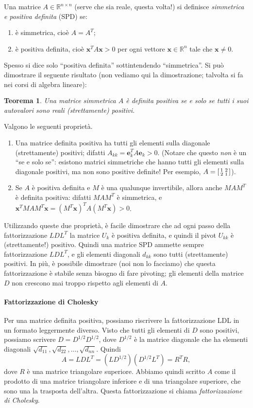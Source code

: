 \documentclass[a4paper]{report}
\newtheorem{theorem}{Teorema}[chapter]
\theoremstyle{definiton}
\theoremstyle{remark}
\begin{document}
Una matrice $A\in\mathbb{R}^{n\times n}$ (serve che sia reale, questa volta!) si definisce \emph{simmetrica e positiva definita} (SPD) se:
\begin{enumerate}
    \item è simmetrica, cioè $A=A^T$;
    \item è positiva definita, cioè $\mathbf{x}^TA\mathbf{x} > 0$ per ogni vettore $\mathbf{x}\in \mathbb{R}^n$ tale che $\mathbf{x}\neq 0$.
\end{enumerate}
Spesso si dice solo ``positiva definita'' sottintendendo ``simmetrica''. Si può dimostrare il seguente risultato (non vediamo qui la dimostrazione; talvolta si fa nei corsi di algebra lineare):
\begin{theorem}
Una matrice simmetrica $A$ è definita positiva se e solo se tutti i suoi autovalori sono reali (strettamente) positivi. 
\end{theorem}
Valgono le seguenti proprietà.
\begin{enumerate}
    \item Una matrice definita positiva ha tutti gli elementi sulla diagonale (strettamente) positivi; difatti $A_{kk} = \mathbf{e}_k^T A \mathbf{e}_k > 0$. (Notare che questo \emph{non} è un ``se e solo se'': esistono matrici simmetriche che hanno tutti gli elementi sulla diagonale positivi, ma non sono positive definite! Per esempio, $A = \begin{bsmallmatrix}
        1 & 2\\ 2 & 1
    \end{bsmallmatrix}$).
    \item Se $A$ è positiva definita e $M$ è una qualunque invertibile, allora anche $MAM^T$ è definita positiva: difatti $MAM^T$ è simmetrica, e $\mathbf{x}^T MAM^T \mathbf{x} = (M^T\mathbf{x})^T A (M^T\mathbf{x}) > 0$.
\end{enumerate}
Utilizzando queste due proprietà, è facile dimostrare che ad ogni passo della fattorizzazione $LDL^T$ la matrice $U_k$ è positiva definita, e quindi il pivot $U_{kk}$ è (strettamente!) positivo. Quindi una matrice SPD ammette sempre fattorizzazione $LDL^T$, e gli elementi diagonali $d_{kk}$ sono tutti (strettamente) positivi. In più, è possibile dimostrare (noi non lo facciamo) che questa fattorizzazione è stabile senza bisogno di fare pivoting; gli elementi della matrice $D$ non crescono mai troppo rispetto agli elementi di $A$.

\paragraph{Fattorizzazione di Cholesky}
Per una matrice definita positiva, possiamo riscrivere la fattorizzazione LDL in un formato leggermente diverso. Visto che tutti gli elementi di $D$ sono positivi, possiamo scrivere $D = D^{1/2} D^{1/2}$, dove $D^{1/2}$ è la matrice diagonale che ha elementi diagonali $\sqrt{d_{11}}, \sqrt{d_{22}}, \dots, \sqrt{d_{nn}}$. Quindi
\[
A = LDL^T = (LD^{1/2})(D^{1/2}L^T) = R^TR,
\]
dove $R$ è una matrice triangolare superiore. Abbiamo quindi scritto $A$ come il prodotto di una matrice triangolare inferiore e di una triangolare superiore, che sono una la trasposta dell'altra. Questa fattorizzazione si chiama \emph{fattorizzazione di Cholesky}. 
\end{document}
